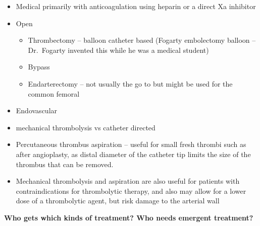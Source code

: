 \documentclass[
]{book}
\begin{document}
\begin{itemize}
\item
  Medical primarily with anticoagulation using heparin or a direct Xa
  inhibitor
\item
  Open

  \begin{itemize}
  \item
    Thrombectomy -- balloon catheter based (Fogarty embolectomy
    balloon -- Dr.~Fogarty invented this while he was a medical
    student)
  \item
    Bypass
  \item
    Endarterectomy -- not usually the go to but might be used for
    the common femoral~
  \end{itemize}
\item
  Endovascular~
\end{itemize}

\begin{itemize}
\item
  mechanical thrombolysis vs catheter directed
\item
  Percutaneous thrombus aspiration -- useful for small fresh thrombi
  such as after angioplasty, as distal diameter of the catheter tip
  limits the size of the thrombus that can be removed.~
\item
  Mechanical thrombolysis and aspiration are also useful for patients
  with contraindications for thrombolytic therapy, and also may allow
  for a lower dose of a thrombolytic agent, but risk damage to the
  arterial wall
\end{itemize}

\textbf{Who gets which kinds of treatment? Who needs emergent treatment?}
\end{document}
